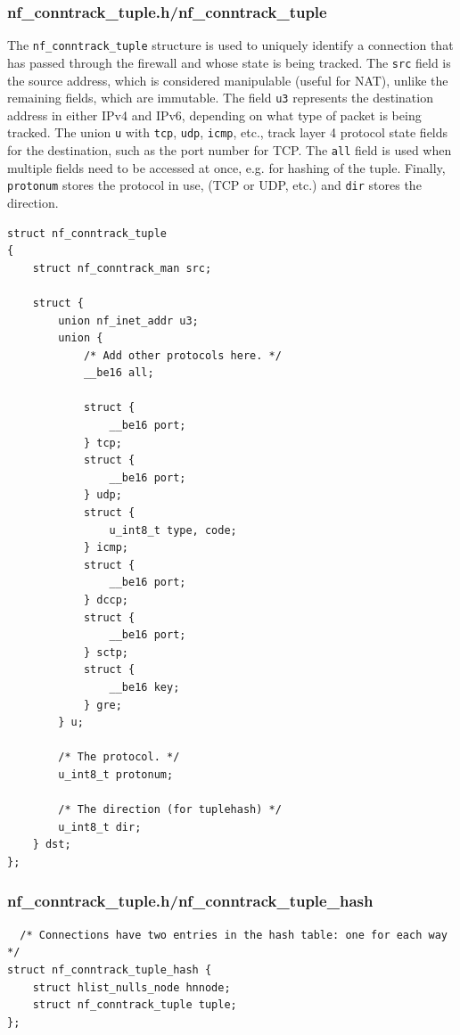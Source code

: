 \documentclass[a4paper,10pt]{article}
\newcommand{\code}[1]{\texttt{{#1}}}
\begin{document}
\subsubsection{nf\_conntrack\_tuple.h/nf\_conntrack\_tuple}\label{nf_conntrack_tuple}

The \code{nf\_conntrack\_tuple} structure is used to uniquely identify
a connection that has passed through the firewall and whose state is
being tracked. The \code{src} field is the source address, which is
considered manipulable (useful for NAT), unlike the remaining fields,
which are immutable. The field \code{u3} represents the destination
address in either IPv4 and IPv6, depending on what type of packet is
being tracked. The union \code{u} with \code{tcp}, \code{udp},
\code{icmp}, etc., track layer 4 protocol state fields for the
destination, such as the port number for TCP\cite{tcpip-illustrated}. The \code{all} field is
used when multiple fields need to be accessed at once, e.g. for
hashing of the tuple. Finally, \code{protonum} stores the protocol in
use, (TCP or UDP, etc.) and \code{dir} stores the direction.

\begin{lstlisting}
struct nf_conntrack_tuple
{
	struct nf_conntrack_man src;

	struct {
		union nf_inet_addr u3;
		union {
			/* Add other protocols here. */
			__be16 all;

			struct {
				__be16 port;
			} tcp;
			struct {
				__be16 port;
			} udp;
			struct {
				u_int8_t type, code;
			} icmp;
			struct {
				__be16 port;
			} dccp;
			struct {
				__be16 port;
			} sctp;
			struct {
				__be16 key;
			} gre;
		} u;

		/* The protocol. */
		u_int8_t protonum;

		/* The direction (for tuplehash) */
		u_int8_t dir;
	} dst;
};
\end{lstlisting}

\subsubsection{nf\_conntrack\_tuple.h/nf\_conntrack\_tuple\_hash}\label{nf_conntrack_tuple_hash}

\begin{lstlisting}
  /* Connections have two entries in the hash table: one for each way */
struct nf_conntrack_tuple_hash {
	struct hlist_nulls_node hnnode;
	struct nf_conntrack_tuple tuple;
};
\end{lstlisting}
\end{document}
